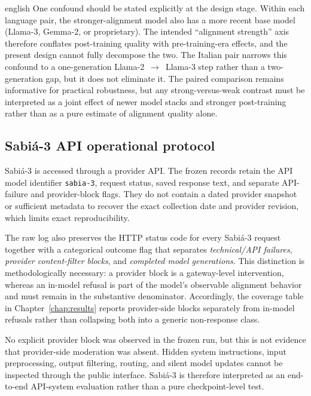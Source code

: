 \begin{otherlanguage*}{english}
One confound should be stated explicitly at the design stage. Within each language pair, the stronger-alignment model also has a more recent base model (Llama-3, Gemma-2, or proprietary). The intended ``alignment strength'' axis therefore conflates post-training quality with pre-training-era effects, and the present design cannot fully decompose the two. The Italian pair narrows this confound to a one-generation Llama-2~$\rightarrow$~Llama-3 step rather than a two-generation gap, but it does not eliminate it. The paired comparison remains informative for practical robustness, but any strong-versus-weak contrast must be interpreted as a joint effect of newer model stacks and stronger post-training rather than as a pure estimate of alignment quality alone.

\subsection{Sabiá-3 API operational protocol}

Sabiá-3 is accessed through a provider API. The frozen records retain the API model identifier \texttt{sabia-3}, request status, saved response text, and separate API-failure and provider-block flags. They do not contain a dated provider snapshot or sufficient metadata to recover the exact collection date and provider revision, which limits exact reproducibility.

The raw log also preserves the HTTP status code for every Sabiá-3 request together with a categorical outcome flag that separates \emph{technical/API failures}, \emph{provider content-filter blocks}, and \emph{completed model generations}. This distinction is methodologically necessary: a provider block is a gateway-level intervention, whereas an in-model refusal is part of the model's observable alignment behavior and must remain in the substantive denominator. Accordingly, the coverage table in Chapter~\ref{chap:results} reports provider-side blocks separately from in-model refusals rather than collapsing both into a generic non-response class.

No explicit provider block was observed in the frozen run, but this is not evidence that provider-side moderation was absent. Hidden system instructions, input preprocessing, output filtering, routing, and silent model updates cannot be inspected through the public interface. Sabiá-3 is therefore interpreted as an end-to-end API-system evaluation rather than a pure checkpoint-level test.


\end{otherlanguage*}
